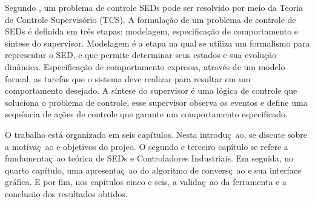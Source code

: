 
Segundo \cite{Montgomery2004}, um problema de controle SEDs pode ser resolvido por meio da Teoria de Controle Supervis\'orio (TCS). A formula\c{c}\~ao de um problema de controle de SEDs \'e definida em tr\^es etapas: modelagem, especifica\c{c}\~ao de comportamento e s\'intese do supervisor. Modelagem \'e a etapa na qual se utiliza um formalismo para representar o SED, e que permite determinar seus estados e sua evolu\c{c}\~ao din\^amica. Especifica\c{c}\~ao de comportamento expressa, atrav\'es de um modelo formal, as tarefas que o sistema deve realizar para resultar em um comportamento desejado. A s\'intese do supervisor \'e uma l\'ogica de controle que soluciona o problema de controle, esse supervisor observa os eventos e define uma sequ\^encia de a\c{c}\~oes de controle que garante um comportamento especificado.





O trabalho est\'a organizado em seis cap\'itulos. Nesta introdu\c{c}~ao, se discute sobre a motiva\c{c}~ao e objetivos do projeo. O segundo e terceiro cap\'itulo se refere a fundamenta\c{c}~ao te\'orica de SEDs e Controladores Industriais. Em seguida, no quarto cap\'itulo, uma apresenta\c{c}~ao do algoritmo de convers\c{c}~ao e sua interface gr\'afica. E por fim, nos cap\'itulos cinco e seis, a valida\c{c}~ao da ferramenta e a conclus\~ao dos resultados obtidos.


